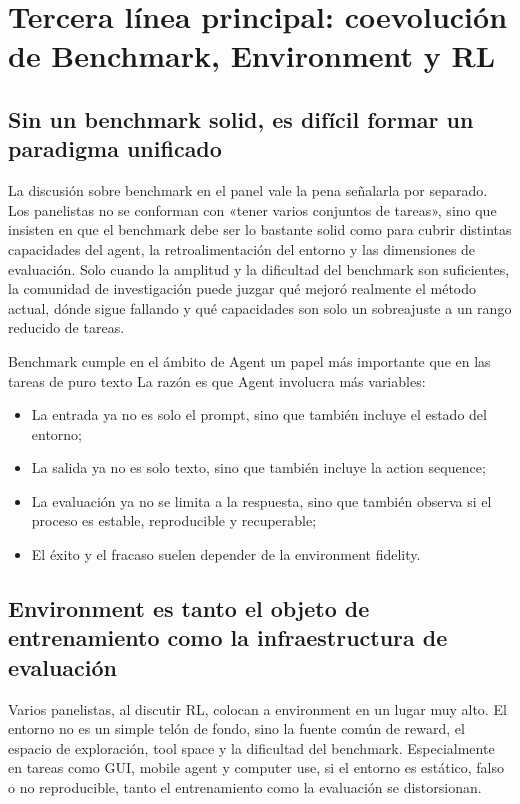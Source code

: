 \section{Tercera línea principal: coevolución de Benchmark, Environment y RL}

\subsection{Sin un benchmark solid, es difícil formar un paradigma unificado}
La discusión sobre benchmark en el panel vale la pena señalarla por separado. Los panelistas no se conforman con «tener varios conjuntos de tareas», sino que insisten en que el benchmark debe ser lo bastante solid como para cubrir distintas capacidades del agent, la retroalimentación del entorno y las dimensiones de evaluación. Solo cuando la amplitud y la dificultad del benchmark son suficientes, la comunidad de investigación puede juzgar qué mejoró realmente el método actual, dónde sigue fallando y qué capacidades son solo un sobreajuste a un rango reducido de tareas.

\begin{importantbox}{Benchmark cumple en el ámbito de Agent un papel más importante que en las tareas de puro texto}
La razón es que Agent involucra más variables:
\begin{itemize}
  \item La entrada ya no es solo el prompt, sino que también incluye el estado del entorno;
  \item La salida ya no es solo texto, sino que también incluye la action sequence;
  \item La evaluación ya no se limita a la respuesta, sino que también observa si el proceso es estable, reproducible y recuperable;
  \item El éxito y el fracaso suelen depender de la environment fidelity.
\end{itemize}
\end{importantbox}

\subsection{Environment es tanto el objeto de entrenamiento como la infraestructura de evaluación}
Varios panelistas, al discutir RL, colocan a environment en un lugar muy alto. El entorno no es un simple telón de fondo, sino la fuente común de reward, el espacio de exploración, tool space y la dificultad del benchmark. Especialmente en tareas como GUI, mobile agent y computer use, si el entorno es estático, falso o no reproducible, tanto el entrenamiento como la evaluación se distorsionan.


